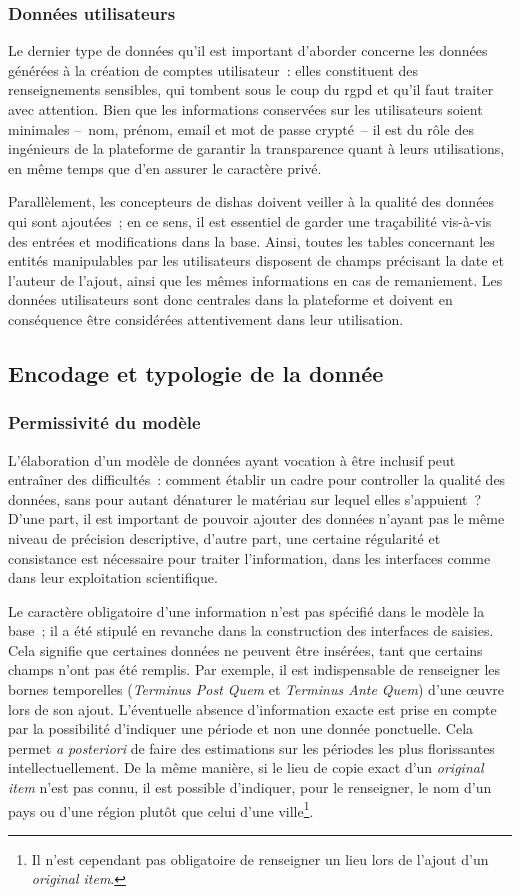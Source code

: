 \documentclass[a4paper,12pt,twoside]{book}
\newcommand{\eng}{\emph}
\newcommand{\oi}{\eng{original item}\xspace}
\newcommand{\dishas}{\gls{dishas}\xspace}
\newcommand{\rgpd}{\gls{rgpd}\xspace}
\begin{document}
			\subsubsection{Données utilisateurs}
Le dernier type de données qu'il est important d'aborder concerne les données générées à la création de comptes utilisateur~: elles constituent des renseignements sensibles, qui tombent sous le coup du \rgpd et qu'il faut traiter avec attention. Bien que les informations conservées sur les utilisateurs soient minimales –~nom, prénom, email et mot de passe crypté~– il est du rôle des ingénieurs de la plateforme de garantir la transparence quant à leurs utilisations, en même temps que d'en assurer le caractère privé.

Parallèlement, les concepteurs de \dishas doivent veiller à la qualité des données qui sont ajoutées~; en ce sens, il est essentiel de garder une traçabilité vis-à-vis des entrées et modifications dans la base. Ainsi, toutes les tables concernant les entités manipulables par les utilisateurs disposent de champs précisant la date et l'auteur de l'ajout, ainsi que les mêmes informations en cas de remaniement. Les données utilisateurs sont donc centrales dans la plateforme et doivent en conséquence être considérées attentivement dans leur utilisation.

		\subsection{Encodage et typologie de la donnée}
			\subsubsection{Permissivité du modèle}
L'élaboration d'un modèle de données ayant vocation à être inclusif peut entraîner des difficultés~: comment établir un cadre pour controller la qualité des données, sans pour autant dénaturer le matériau sur lequel elles s'appuient~? D'une part, il est important de pouvoir ajouter des données n'ayant pas le même niveau de précision descriptive, d'autre part, une certaine régularité et consistance est nécessaire pour traiter l'information, dans les interfaces comme dans leur exploitation scientifique.

Le caractère obligatoire d'une information n'est pas spécifié dans le modèle la base~; il a été stipulé en revanche dans la construction des interfaces de saisies. Cela signifie que certaines données ne peuvent être insérées, tant que certains champs n'ont pas été remplis. Par exemple, il est indispensable de renseigner les bornes temporelles (\eng{Terminus Post Quem} et \eng{Terminus Ante Quem}) d'une œuvre lors de son ajout. L'éventuelle absence d'information exacte est prise en compte par la possibilité d'indiquer une période et non une donnée ponctuelle. Cela permet \eng{a posteriori} de faire des estimations sur les périodes les plus florissantes intellectuellement. De la même manière, si le lieu de copie exact d'un \oi n'est pas connu, il est possible d'indiquer, pour le renseigner, le nom d'un pays ou d'une région plutôt que celui d'une ville\footnote{Il n'est cependant pas obligatoire de renseigner un lieu lors de l'ajout d'un \oi.}.
\end{document}
